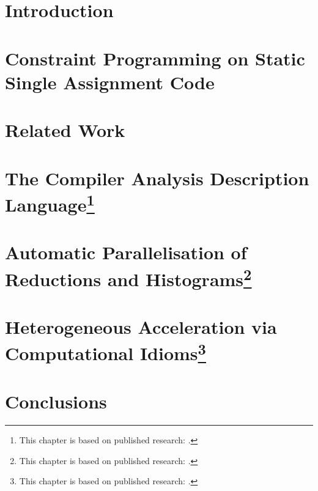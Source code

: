\documentclass[phd,icsa,twoside,logo,11pt]{infthesis}
\begin{document}
\chapter{Introduction}
    \label{chapter:introduction}
    

\chapter{Constraint Programming on Static Single Assignment Code}
    \label{chapter:theory}
    

\chapter{Related Work}
    \label{chapter:literature}
    

\chapter[The Compiler Analysis Description Language]
        {The Compiler Analysis Description Language\footnote{This
         chapter is based on published research:
         \citet{Ginsbach:2018:CDS:3178372.3179515}.}}
    \label{chapter:candl}
    

\chapter[Automatic Parallelisation of Reductions and Histograms]
        {Automatic Parallelisation of Reductions and Histograms\footnote{This
         chapter is based on published research:
         \citet{ginsbach2017discovery}.}}
    \label{chapter:reductions}
    

\chapter[Heterogeneous Acceleration via Computational Idioms]
        {Heterogeneous Acceleration via Computational Idioms\footnote{This
         chapter is based on published research:
         \citet{Ginsbach:2018:AML:3173162.3173182}.}}
    \label{chapter:idioms}
    

\chapter{Conclusions}
    \label{chapter:conclusion}
    
\end{document}
